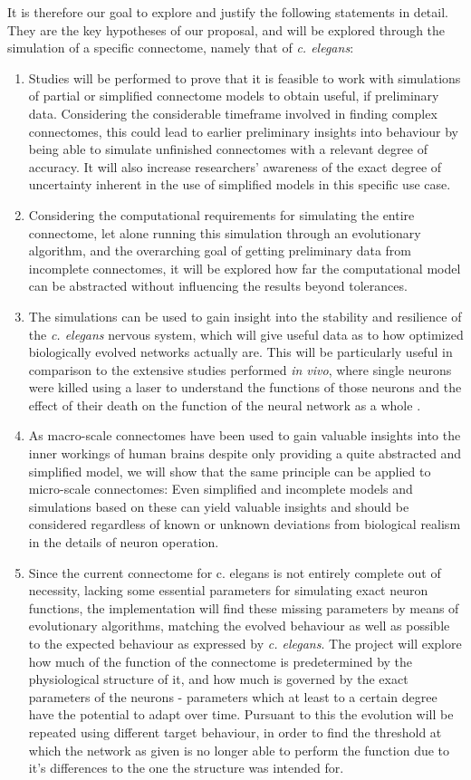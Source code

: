 \documentclass[a4paper,11pt]{article}
\begin{document}
It is therefore our goal to explore and justify the following statements in detail. They are the key hypotheses of our proposal, and will be explored through the simulation of a specific connectome, namely that of \emph{c. elegans}:
\begin{enumerate}
\item Studies will be performed to prove that it is feasible to work with simulations of partial or simplified connectome models to obtain useful, if preliminary data. Considering the considerable timeframe involved in finding complex connectomes, this could lead to earlier preliminary insights into behaviour by being able to simulate unfinished connectomes with a relevant degree of accuracy. It will also increase researchers' awareness of the exact degree of uncertainty inherent in the use of simplified models in this specific use case.
\item Considering the computational requirements for simulating the entire connectome, let alone running this simulation through an evolutionary algorithm, and the overarching goal of getting preliminary data from incomplete connectomes, it will be explored how far the computational model can be abstracted without influencing the results beyond tolerances.
\item The simulations can be used to gain insight into the stability and resilience of the \emph{c. elegans} nervous system, which will give useful data as to how optimized biologically evolved networks actually are. This will be particularly useful in comparison to the extensive studies performed \emph{in vivo}, where single neurons were killed using a laser to understand the functions of those neurons and the effect of their death on the function of the neural network as a whole \citep{ThatBlueBook}. 
\item As macro-scale connectomes have been used to gain valuable insights into the inner workings of human brains despite only providing a quite abstracted and simplified model, we will show that the same principle can be applied to micro-scale connectomes: Even simplified and incomplete models and simulations based on these can yield valuable insights and should be considered regardless of known or unknown deviations from biological realism in the details of neuron operation.
\item Since the current connectome for c. elegans is not entirely complete out of necessity, lacking some essential parameters for simulating exact neuron functions, the implementation will find these missing parameters by means of evolutionary algorithms, matching the evolved behaviour as well as possible to the expected behaviour as expressed by \emph{c. elegans}. The project will explore how much of the function of the connectome is predetermined by the physiological structure of it, and how much is governed by the exact parameters of the neurons - parameters which at least to a certain degree have the potential to adapt over time. Pursuant to this the evolution will be repeated using different target behaviour, in order to find the threshold at which the network as given is no longer able to perform the function due to it's differences to the one the structure was intended for. 

\end{enumerate}
\end{document}
